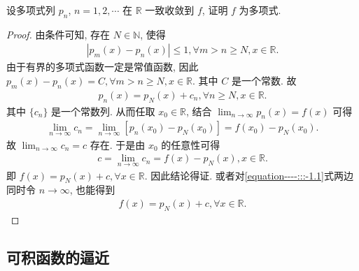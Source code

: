 \documentclass[../../main.tex]{subfiles}
\begin{document}
\begin{example}
设多项式列 $p_n$, $n = 1,2,\cdots$ 在 $\mathbb{R}$ 一致收敛到 $f$, 证明 $f$ 为多项式. 
\end{example}
\begin{proof}
由条件可知, 存在 $N\in \mathbb{N}$, 使得
\begin{align*}
|p_m(x) - p_n(x)| \leqslant 1, \forall m > n \geqslant N, x\in \mathbb{R}.
\end{align*}
由于有界的多项式函数一定是常值函数, 因此 $p_m(x) - p_n(x) = C, \forall m > n \geqslant N, x\in \mathbb{R}$. 其中 $C$ 是一个常数. 故
\begin{align}
p_n(x) = p_N(x) + c_n, \forall n \geqslant N, x\in \mathbb{R}. \label{equation----:::-1.1}
\end{align}
其中 $\{c_n\}$ 是一个常数列. 从而任取 $x_0\in \mathbb{R}$, 结合 $\lim_{n\rightarrow \infty}p_n(x) = f(x)$ 可得
\begin{align*}
\lim_{n\rightarrow \infty}c_n = \lim_{n\rightarrow \infty}[p_n(x_0) - p_N(x_0)] = f(x_0) - p_N(x_0).
\end{align*}
故 $\lim_{n\rightarrow \infty}c_n = c$ 存在. 于是由 $x_0$ 的任意性可得
\begin{align*}
c = \lim_{n\rightarrow \infty}c_n = f(x) - p_N(x), x\in \mathbb{R}.
\end{align*}
即 $f(x) = p_N(x) + c, \forall x\in \mathbb{R}$. 因此结论得证.
或者对\eqref{equation----:::-1.1}式两边同时令 $n\rightarrow \infty$, 也能得到
\begin{align*}
f(x) = p_N(x) + c, \forall x\in \mathbb{R}.
\end{align*} 

\end{proof}

\subsection{可积函数的逼近}
\end{document}
